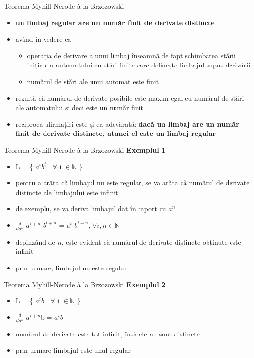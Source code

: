 \documentclass[pdf]{beamer}
\begin{document}
\begin{frame}{Teorema Myhill-Nerode à la Brzozowski}
\begin{itemize}
\item
\textbf{un limbaj regular are un număr finit de derivate distincte}
\item
având în vedere că 
\begin{itemize}
\item
operația de derivare a unui limbaj înseamnă de fapt schimbarea stării inițiale a automatului cu stări finite care definește limbajul supus derivării 
\item
numărul de stări ale unui automat este finit
\end{itemize}
\item
rezultă că numărul de derivate posibile este maxim egal cu numărul de stări ale automatului și deci este un număr finit
\item
reciproca afirmației este și ea adevărată: \textbf{dacă un limbaj are un număr finit de derivate distincte, atunci el este un limbaj regular}
\end{itemize}
\end{frame}



\begin{frame}{Teorema Myhill-Nerode à la Brzozowski}
\textbf{Exemplul 1}
\begin{itemize}
\item
L = \{ $a^{i} b^{i}$ | $\forall$ i $\in \mathbb{N}$ \}
\item
pentru a arăta că limbajul nu este regular, se va arăta că numărul de derivate distincte ale limbajului este infinit
\item
de exemplu, se va deriva limbajul dat în raport cu $a^n$
\item
$\frac{d}{da^{n}}$ $a^{i+n}$ $b^{i+n}$ = $a^{i}$ $b^{i+n}$, $\forall i,n \in \mathbb{N}$
\item
depinzând de $n$, este evident că numărul de derivate distincte obținute este infinit
\item
prin urmare, limbajul nu este regular
\end{itemize}
\end{frame}



\begin{frame}{Teorema Myhill-Nerode à la Brzozowski}
\textbf{Exemplul 2}
\begin{itemize}
\item
L = \{ $a^{i} b$ | $\forall$ i $\in \mathbb{N}$ \}
\item
$\frac{d}{da^{n}}$ $a^{i+n}$b = $a^{i}b $ 
\item
numărul de derivate este tot infinit, însă ele nu sunt distincte
\item
prin urmare limbajul este unul regular
\end{itemize}
\end{frame}
\end{document}

